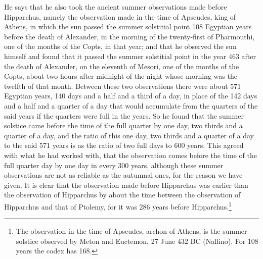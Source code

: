 \documentclass[11pt]{article}
\newcommand{\ArPage}[1]{\marginpar{\footnotesize\color{gray}Ar.\,p.\,#1}}
\begin{document}
\par \ArPage{63}He says that he also took the ancient summer observations made before Hipparchus, namely the observation made in the time of Apseudes, king of Athens, in which the sun passed the summer solstitial point 108 Egyptian years before the death of Alexander, in the morning of the twenty-first of Pharmouthi, one of the months of the Copts, in that year; and that he observed the sun himself and found that it passed the summer solstitial point in the year 463 after the death of Alexander, on the eleventh of Mesori, one of the months of the Copts, about two hours after midnight of the night whose morning was the twelfth of that month. Between these two observations there were about 571 Egyptian years, 140 days and a half and a third of a day, in place of the 142 days and a half and a quarter of a day that would accumulate from the quarters of the said years if the quarters were full in the years. So he found that the summer solstice came before the time of the full quarter by one day, two thirds and a quarter of a day, and the ratio of this one day, two thirds and a quarter of a day to the said 571 years is as the ratio of two full days to 600 years. This agreed with what he had worked with, that the observation comes before the time of the full quarter day by one day in every 300 years, although these summer observations are not as reliable as the autumnal ones, for the reason we have given. It is clear that the observation made before Hipparchus was earlier than the observation of Hipparchus by about the time between the observation of Hipparchus and that of Ptolemy, for it was 286 years before Hipparchus.\footnote{The observation in the time of Apseudes, archon of Athens, is the summer solstice observed by Meton and Euctemon, 27 June 432 BC (Nallino). For 108 years the codex has 168.}\par
\end{document}

